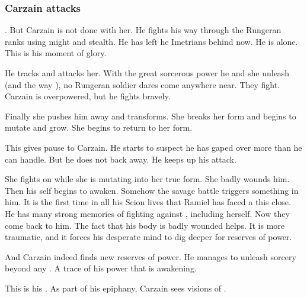 \subsubsection{Carzain attacks \Takestsha}
\Takestsha {}. 
But Carzain is not done with her.
He fights his way through the Rungeran ranks using might and stealth.
He has left he Imetrians behind now. 
He is alone. 
This is his moment of glory. 

He tracks \Takestsha and attacks her. 
With the great sorcerous power he and she unleash (and the way ), no Rungeran soldier dares come anywhere near. 
They fight. 
Carzain is overpowered, but he fights bravely. 

Finally she pushes him away and transforms. 
She breaks her \human form and begins to mutate and grow. 
She begins to return to her \draconian form.

This gives pause to Carzain. 
He starts to suspect he has gaped over more than he can handle. 
But he does not back away.
He keeps up his attack. 

She fights on while she is mutating into her true form. 
She badly wounds him. 
Then his \malach self begins to awaken. 
Somehow the savage battle triggers something in him.
It is the first time in all his Scion lives that Ramiel has faced a \dragon this close. 
He has many strong memories of fighting against \dragons, including \Nzessuacrith herself. 
Now they come back to him. 
The fact that his body is badly wounded helps. 
It is more traumatic, and it forces his desperate mind to dig deeper for reserves of power. 

And Carzain indeed finds new reserves of power. 
He manages to unleash sorcery beyond any \human. 
A trace of his \sathariah power that is awakening. 

This is his . 
As part of his epiphany, Carzain sees visions of \Mystraacht.


